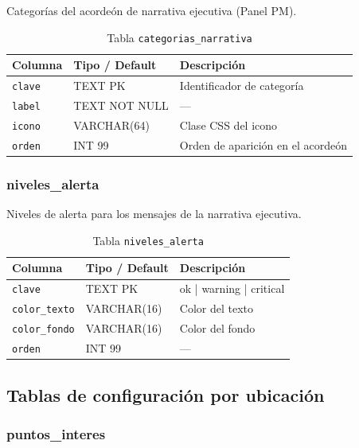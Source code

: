 \documentclass[12pt, a4paper]{article}
\begin{document}
Categorías del acordeón de narrativa ejecutiva (Panel PM).

\begin{table}[H]
\centering
\renewcommand{\arraystretch}{1.2}
\begin{tabular}{llp{5.5cm}}
\toprule
\textbf{Columna} & \textbf{Tipo / Default} & \textbf{Descripción} \\
\midrule
\texttt{clave} & TEXT PK       & Identificador de categoría \\
\texttt{label} & TEXT NOT NULL & — \\
\texttt{icono} & VARCHAR(64)   & Clase CSS del icono \\
\texttt{orden} & INT 99        & Orden de aparición en el acordeón \\
\bottomrule
\end{tabular}
\caption{Tabla \texttt{categorias\_narrativa}}
\end{table}

\subsubsection{niveles\_alerta}

Niveles de alerta para los mensajes de la narrativa ejecutiva.

\begin{table}[H]
\centering
\renewcommand{\arraystretch}{1.2}
\begin{tabular}{llp{5.5cm}}
\toprule
\textbf{Columna} & \textbf{Tipo / Default} & \textbf{Descripción} \\
\midrule
\texttt{clave}        & TEXT PK    & ok | warning | critical \\
\texttt{color\_texto} & VARCHAR(16) & Color del texto \\
\texttt{color\_fondo} & VARCHAR(16) & Color del fondo \\
\texttt{orden}        & INT 99     & — \\
\bottomrule
\end{tabular}
\caption{Tabla \texttt{niveles\_alerta}}
\end{table}

\subsection{Tablas de configuración por ubicación}

\subsubsection{puntos\_interes}
\end{document}
